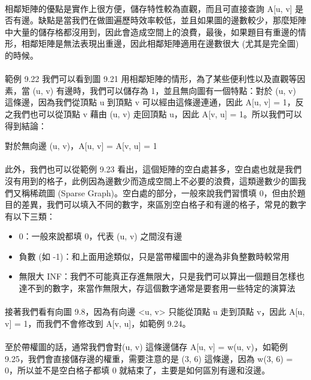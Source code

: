 \documentclass[12pt,a4paper,oneside]{report}
\begin{document}
\begin{CJK}{UTF8}{bkai}
\paragraph{}相鄰矩陣的優點是實作上很方便，儲存特性較為直觀，而且可直接查詢 A[u, v] 是否有邊。缺點是當我們在做圖遍歷時效率較低，並且如果圖的邊數較少，那麼矩陣中大量的儲存格都沒用到，因此會造成空間上的浪費，最後，如果題目有重邊的情形，相鄰矩陣是無法表現出重邊，因此相鄰矩陣適用在邊數很大 (尤其是完全圖) 的時候。
\paragraph{}範例 9.22 我們可以看到圖 9.21 用相鄰矩陣的情形，為了某些便利性以及直觀等因素，當 (u, v) 有邊時，我們可以儲存為 1，並且無向圖有一個特點：對於 (u, v) 這條邊，因為我們從頂點 u 到頂點 v 可以經由這條邊連通，因此 A[u, v] = 1，反之我們也可以從頂點 v 藉由 (u, v) 走回頂點 u，因此 A[v, u] = 1。所以我們可以得到結論：

\begin{center}
對於無向邊 (u, v)，A[u, v] = A[v, u] = 1
\end{center}

\paragraph{}此外，我們也可以從範例 9.23 看出，這個矩陣的空白處甚多，空白處也就是我們沒有用到的格子，此例因為邊數少而造成空間上不必要的浪費，這類邊數少的圖我們又稱稀疏圖 (Sparse Graph)。空白處的部分，一般來說我們習慣填 0，但由於題目的差異，我們可以填入不同的數字，來區別空白格子和有邊的格子，常見的數字有以下三類：

\begin{itemize}
\item 0：一般來說都填 0，代表 (u, v) 之間沒有邊
\item 負數 (如 -1)：和上面用途類似，只是當帶權圖中的邊為非負整數時較常用
\item 無限大 INF：我們不可能真正存進無限大，只是我們可以算出一個題目怎樣也達不到的數字，來當作無限大，存這個數字通常是要套用一些特定的演算法
\end{itemize}

\paragraph{}接著我們看有向圖 9.8，因為有向邊 <u, v> 只能從頂點 u 走到頂點 v，因此 A[u, v] = 1，而我們不會修改到 A[v, u]，如範例 9.24。
\paragraph{}至於帶權圖的話，通常我們會對(u, v) 這條邊儲存 A[u, v] = w(u, v)，如範例 9.25，我們會直接儲存邊的權重，需要注意的是 (3, 6) 這條邊，因為 w(3, 6) = 0，所以並不是空白格子都填 0 就結束了，主要是如何區別有邊和沒邊。



\end{CJK}
\end{document}
